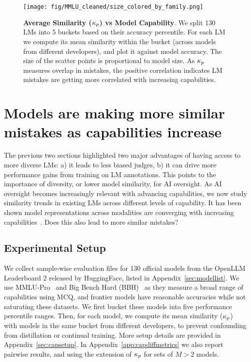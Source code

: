 \begin{figure}
    \centering
    \texttt{[image: fig/MMLU\_cleaned/size\_colored\_by\_family.png]}
    \caption{\textbf{Average Similarity ($\kappa_{p}$) vs Model Capability}. We split 130 LMs into 5 buckets based on their accuracy percentile. For each LM we compute its mean similarity within the bucket (across models from different developers), and plot it against model accuracy. The size of the scatter points is proportional to model size. As $\kappa_{p}$ measures overlap in mistakes, the positive correlation indicates LM mistakes are getting more correlated with increasing capabilities.}
    \label{fig:capability-similarity}
    \vspace{-0.4cm}
\end{figure}

\section{Models are making more similar mistakes as capabilities increase}
\label{sec:errors}

The previous two sections highlighted two major advantages of having access to more diverse LMs: a) it leads to less biased judges, b) it can drive more performance gains from training on LM annotations. This points to the importance of diversity, or lower model similarity, for AI oversight. As AI oversight becomes increasingly relevant with advancing capabilities, we now study similarity trends in existing LMs across different levels of capability. It has been shown model representations across modalities are converging with increasing capabilities~\citep{huh2024platonic}. Does this also lead to more similar mistakes?

\subsection{Experimental Setup}
We collect sample-wise evaluation files for 130 official models from the OpenLLM Leaderboard 2 released by HuggingFace, listed in Appendix~\ref{sec:modellist}. We use MMLU-Pro~\citep{wang2024mmlupro} and Big Bench Hard (BBH)~\citep{suzgun-etal-2023-challenging} as they measure a broad range of capabilities using MCQ, and frontier models have reasonable accuracies while not saturating these datasets. We first bucket these models into five performance percentile ranges. Then, for each model, we compute its mean similarity ($\kappa_{p}$) with models in the same bucket from different developers, to prevent confounding from distillation or continual training. More setup details are provided in Appendix~\ref{sec:capsetup}. In Appendix~\ref{app:capdiffmetrics} we also report pairwise results, and using the extension of $\kappa_{p}$ for sets of $M>2$ models.

